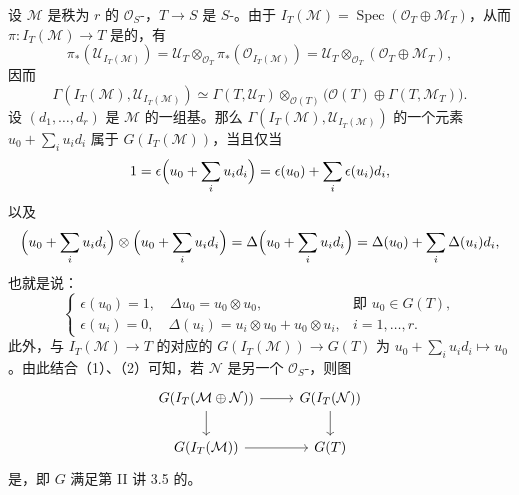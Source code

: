 设 $\mathcal M$ 是秩为 $r$ 的 $\mathcal O_S$-，$T\to S$ 是 $S$-。由于 $I_T(\mathcal M)=\operatorname{Spec}(\mathcal O_T\oplus\mathcal M_T)$，从而 $\pi:I_T(\mathcal M)\to T$ 是的，有
\[
\pi_*(\mathcal U_{I_T(\mathcal M)})=\mathcal U_T\otimes_{\mathcal O_T}\pi_*(\mathcal O_{I_T(\mathcal M)})=\mathcal U_T\otimes_{\mathcal O_T}(\mathcal O_T\oplus\mathcal M_T),
\]
因而
\[
\Gamma(I_T(\mathcal M),\mathcal U_{I_T(\mathcal M)})\simeq\Gamma(T,\mathcal U_T)\otimes_{\mathcal O(T)}\bigl(\mathcal O(T)\oplus\Gamma(T,\mathcal M_T)\bigr).\tag{1}
\]
设 $(d_1,\ldots,d_r)$ 是 $\mathcal M$ 的一组基。那么 $\Gamma(I_T(\mathcal M),\mathcal U_{I_T(\mathcal M)})$ 的一个元素 $u_0+\sum_i u_id_i$ 属于 $G(I_T(\mathcal M))$，当且仅当
\[
1=\epsilon\Bigl(u_0+\sum_i u_id_i\Bigr)=\epsilon(u_0)+\sum_i\epsilon(u_i)d_i,
\]
以及
\[
\Bigl(u_0+\sum_i u_id_i\Bigr)\otimes\Bigl(u_0+\sum_i u_id_i\Bigr)
=\Delta\Bigl(u_0+\sum_i u_id_i\Bigr)=\Delta(u_0)+\sum_i\Delta(u_i)d_i,
\]
也就是说：
\[
\begin{cases}
\epsilon(u_0)=1,\quad\Delta u_0=u_0\otimes u_0,&\text{即 }u_0\in G(T),\\
\epsilon(u_i)=0,\quad\Delta(u_i)=u_i\otimes u_0+u_0\otimes u_i,&i=1,\ldots,r.
\end{cases}\tag{2}
\]
此外，与 $I_T(\mathcal M)\to T$ 的对应的 $G(I_T(\mathcal M))\to G(T)$ 为 $u_0+\sum_i u_id_i\mapsto u_0$。由此结合（1）、（2）可知，若 $\mathcal N$ 是另一个 $\mathcal O_S$-，则图
\[
\begin{tikzcd}
G(I_T(\mathcal M\oplus\mathcal N))\arrow[r]\arrow[d]&G(I_T(\mathcal N))\arrow[d]\\
G(I_T(\mathcal M))\arrow[r]&G(T)
\end{tikzcd}
\]
是，即 $G$ 满足第 II 讲 3.5 的。

